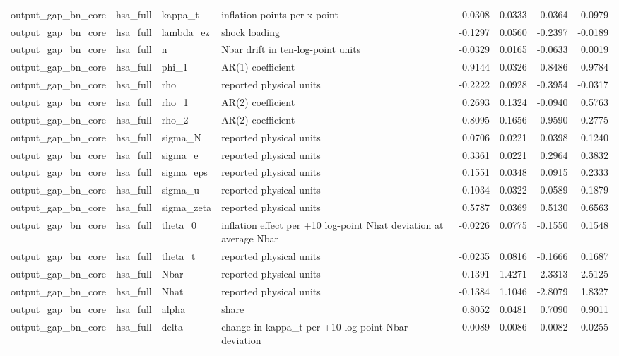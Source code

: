 \begin{tabular}{llllrrrr}
output\_gap\_bn\_core & hsa\_full & kappa\_t & inflation points per x point & 0.0308 & 0.0333 & -0.0364 & 0.0979 \\
output\_gap\_bn\_core & hsa\_full & lambda\_ez & shock loading & -0.1297 & 0.0560 & -0.2397 & -0.0189 \\
output\_gap\_bn\_core & hsa\_full & n & Nbar drift in ten-log-point units & -0.0329 & 0.0165 & -0.0633 & 0.0019 \\
output\_gap\_bn\_core & hsa\_full & phi\_1 & AR(1) coefficient & 0.9144 & 0.0326 & 0.8486 & 0.9784 \\
output\_gap\_bn\_core & hsa\_full & rho & reported physical units & -0.2222 & 0.0928 & -0.3954 & -0.0317 \\
output\_gap\_bn\_core & hsa\_full & rho\_1 & AR(2) coefficient & 0.2693 & 0.1324 & -0.0940 & 0.5763 \\
output\_gap\_bn\_core & hsa\_full & rho\_2 & AR(2) coefficient & -0.8095 & 0.1656 & -0.9590 & -0.2775 \\
output\_gap\_bn\_core & hsa\_full & sigma\_N & reported physical units & 0.0706 & 0.0221 & 0.0398 & 0.1240 \\
output\_gap\_bn\_core & hsa\_full & sigma\_e & reported physical units & 0.3361 & 0.0221 & 0.2964 & 0.3832 \\
output\_gap\_bn\_core & hsa\_full & sigma\_eps & reported physical units & 0.1551 & 0.0348 & 0.0915 & 0.2333 \\
output\_gap\_bn\_core & hsa\_full & sigma\_u & reported physical units & 0.1034 & 0.0322 & 0.0589 & 0.1879 \\
output\_gap\_bn\_core & hsa\_full & sigma\_zeta & reported physical units & 0.5787 & 0.0369 & 0.5130 & 0.6563 \\
output\_gap\_bn\_core & hsa\_full & theta\_0 & inflation effect per +10 log-point Nhat deviation at average Nbar & -0.0226 & 0.0775 & -0.1550 & 0.1548 \\
output\_gap\_bn\_core & hsa\_full & theta\_t & reported physical units & -0.0235 & 0.0816 & -0.1666 & 0.1687 \\
output\_gap\_bn\_core & hsa\_full & Nbar & reported physical units & 0.1391 & 1.4271 & -2.3313 & 2.5125 \\
output\_gap\_bn\_core & hsa\_full & Nhat & reported physical units & -0.1384 & 1.1046 & -2.8079 & 1.8327 \\
output\_gap\_bn\_core & hsa\_full & alpha & share & 0.8052 & 0.0481 & 0.7090 & 0.9011 \\
output\_gap\_bn\_core & hsa\_full & delta & change in kappa\_t per +10 log-point Nbar deviation & 0.0089 & 0.0086 & -0.0082 & 0.0255 \\

\end{tabular}
